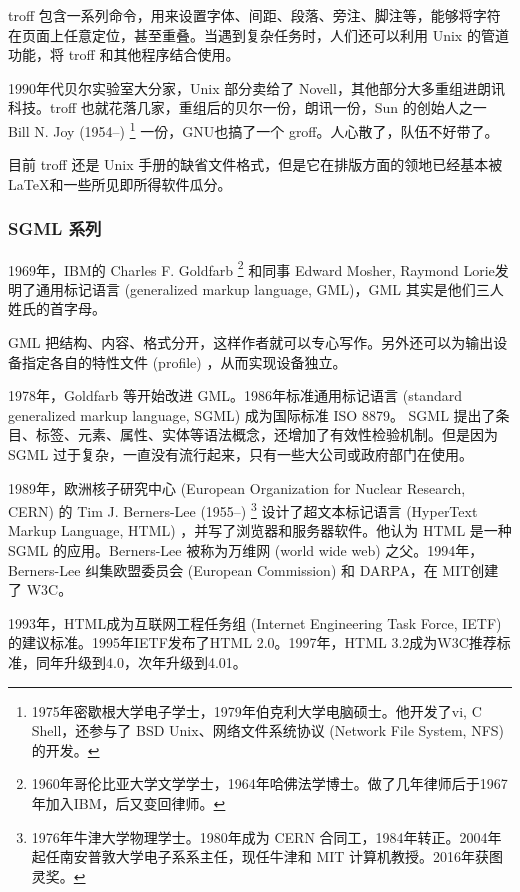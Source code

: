 troff 包含一系列命令，用来设置字体、间距、段落、旁注、脚注等，能够将字符在页面上任意定位，甚至重叠。当遇到复杂任务时，人们还可以利用 Unix 的管道功能，将 troff 和其他程序结合使用。

1990年代贝尔实验室大分家，Unix 部分卖给了 Novell，其他部分大多重组进朗讯科技\indexLucent{}。troff 也就花落几家，重组后的贝尔一份，朗讯一份，Sun 的创始人之一 Bill N. Joy (1954--)\indexJoy{} \footnote{1975年密歇根大学电子学士，1979年伯克利大学电脑硕士。他开发了vi, C Shell，还参与了 BSD Unix、网络文件系统协议 (Network File System, NFS) 的开发。} 一份，GNU\indexGNU 也搞了一个 groff。人心散了，队伍不好带了。

目前 troff 还是 Unix 手册的缺省文件格式，但是它在排版方面的领地已经基本被 \LaTeX 和一些所见即所得软件瓜分。

\subsubsection{SGML 系列}

1969年，IBM\indexIBM 的 Charles F. Goldfarb\indexGoldfarb{} \footnote{1960年哥伦比亚大学文学学士，1964年哈佛法学博士。做了几年律师后于1967年加入IBM，后又变回律师。} 和同事 Edward Mosher\indexMosher , Raymond Lorie\indexLorie 发明了通用标记语言 (generalized markup language, GML)，GML 其实是他们三人姓氏的首字母。

GML 把结构、内容、格式分开，这样作者就可以专心写作。另外还可以为输出设备指定各自的特性文件 (profile) ，从而实现设备独立。

1978年，Goldfarb 等开始改进 GML。1986年标准通用标记语言 (standard generalized markup language, SGML) 成为国际标准 ISO 8879。 SGML 提出了条目、标签、元素、属性、实体等语法概念，还增加了有效性检验机制。但是因为 SGML 过于复杂，一直没有流行起来，只有一些大公司或政府部门在使用。

1989年，欧洲核子研究中心 (European Organization for Nuclear Research, CERN)\indexCERN{} 的 Tim J. Berners-Lee (1955--)\indexBernersLee{} \footnote{1976年牛津大学物理学士。1980年成为 CERN 合同工，1984年转正。2004年起任南安普敦大学电子系系主任，现任牛津和 MIT 计算机教授。2016年获图灵奖。} 设计了超文本标记语言 (HyperText Markup Language, HTML) ，并写了浏览器和服务器软件。他认为 HTML 是一种 SGML 的应用。Berners-Lee 被称为万维网 (world wide web) 之父。1994年，Berners-Lee 纠集欧盟委员会 (European Commission) \indexEC 和 DARPA\indexDARPA{}，在 MIT\indexMIT 创建了 W3C\indexWWWC。

1993年，HTML成为互联网工程任务组 (Internet Engineering Task Force, IETF)\indexIETF{} 的建议标准。1995年IETF发布了HTML 2.0。1997年，HTML 3.2成为W3C推荐标准，同年升级到4.0，次年升级到4.01。

